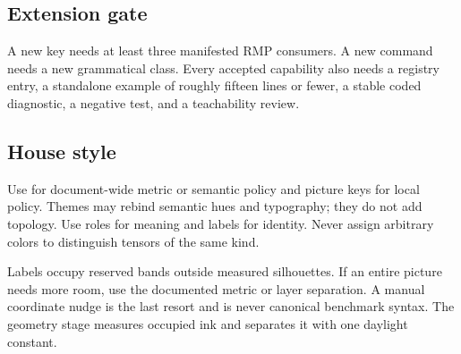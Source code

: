 \subsection{Extension gate}

A new key needs at least three manifested RMP consumers.  A new command needs
a new grammatical class.  Every accepted capability also needs a registry
entry, a standalone example of roughly fifteen lines or fewer, a stable coded
diagnostic, a negative test, and a teachability review.

\subsection{House style}

Use  for document-wide metric or semantic policy and picture keys
for local policy.  Themes may rebind semantic hues and typography; they do not
add topology.  Use roles for meaning and labels for identity.  Never assign
arbitrary colors to distinguish tensors of the same kind.

Labels occupy reserved bands outside measured silhouettes.  If an entire
picture needs more room, use the documented metric or layer separation.  A
manual coordinate nudge is the last resort and is never canonical benchmark
syntax.  The geometry stage measures occupied ink and separates it with one
daylight constant.
